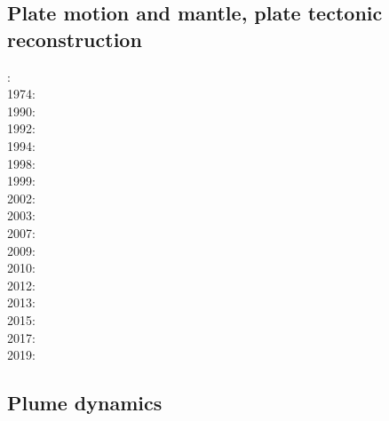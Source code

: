 \subsection{Plate motion and mantle, plate tectonic reconstruction}

{\scriptsize
{}: \cite{mcse73}\\
1974: \cite{sosl74}\\
1990: \cite{dega90}\\
1992: \cite{zieg92a}\\
1994: \cite{guto94}\\
1998: \cite{zhgm98}\\
1999: \cite{ribr99}\\
2002: \cite{stoc02}\\
2003: \cite{evan03}\cite{reta03}\\
2007: \cite{zhzl07}\\
2009: \cite{lizh09}\cite{vasv09}\cite{iabu09}\cite{scbs09}\\
2010: \cite{stto10}\cite{dega10}\\
2012: \cite{huss12}\cite{gutz12}\cite{qumm12}\cite{holr12}\cite{dost12}\cite{shbs12}\\
2013: \cite{mosq13}\cite{cost13}\\
2015: \cite{yoha15}\\
2017: \cite{stid17}\\
2019: \cite{tewg19}
}

\subsection{Plume dynamics}

